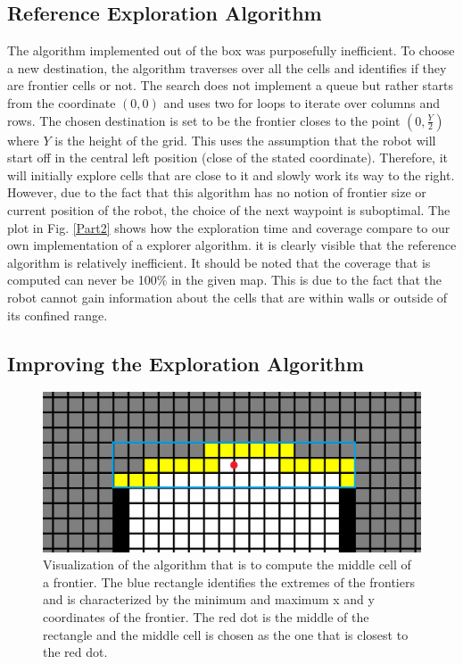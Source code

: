 \documentclass[a4paper,12pt]{article}
\begin{document}
			\subsection{Reference Exploration Algorithm}

				The algorithm implemented out of the box was purposefully inefficient. To choose a new destination, the algorithm traverses over all the cells and identifies if they are frontier cells or not. The search does not implement a queue but rather starts from the coordinate $(0,0)$ and uses two for loops to iterate over columns and rows. The chosen destination is set to be the frontier closes to the point $(0,\frac{Y}{2})$ where $Y$ is the height of the grid. This uses the assumption that the robot will start off in the central left position (close of the stated coordinate). Therefore, it will initially explore cells that are close to it and slowly work its way to the right. However, due to the fact that this algorithm has no notion of frontier size or current position of the robot, the choice of the next waypoint is suboptimal. The plot in Fig. \ref{Part2} shows how the exploration time and coverage compare to our own implementation of a explorer algorithm. it is clearly visible that the reference algorithm is relatively inefficient. It should be noted that the coverage that is computed can never be 100\% in the given map. This is due to the fact that the robot cannot gain information about the cells that are within walls or outside of its confined range.  
			
			\subsection{Improving the Exploration Algorithm}

				\begin{figure}[H]
					\centering
					\includegraphics[scale=0.25]{images/middleCellVisualization.png}
					\caption{Visualization of the algorithm that is to compute the middle cell of a frontier. The blue rectangle identifies the extremes of the frontiers and is characterized by the minimum and maximum x and y coordinates of the frontier. The red dot is the middle of the rectangle and the middle cell is chosen as the one that is closest to the red dot.}
					\label{middleCellVisualization}
				\end{figure}
\end{document}

